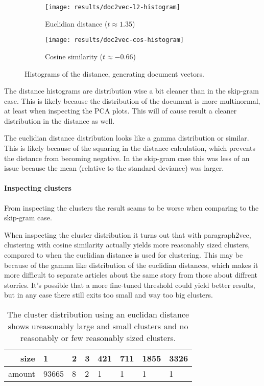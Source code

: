 \begin{figure}[H]
        \centering
        \begin{subfigure}[b]{0.49\textwidth}
                \texttt{[image: results/doc2vec-l2-histogram]}
                \caption{Euclidian distance ($t \approx 1.35$)}
        \end{subfigure}
        \begin{subfigure}[b]{0.49\textwidth}
                \texttt{[image: results/doc2vec-cos-histogram]}
                \caption{Cosine similarity ($t \approx -0.66$)}
        \end{subfigure}
        \caption{Histograms of the distance, generating document vectors.}
\end{figure}

The distance histograms are distribution wise a bit cleaner than in the skip-gram case. This is likely because the distribution of the document is more multinormal, at least when inspecting the PCA plots. This will of cause result a cleaner distribution in the distance as well.

The euclidian distance distribution looks like a gamma distribution or similar. This is likely because of the squaring in the distance calculation, which prevents the distance from becoming negative. In the skip-gram case this was less of an issue because the mean (relative to the standard deviance) was larger.

\paragraph{Inspecting clusters} From inspecting the clusters the result seams to be worse when comparing to the skip-gram case.

When inspecting the cluster distribution it turns out that with paragraph2vec, clustering with cosine similarity actually yields more reasonably sized clusters, compared to when the euclidian distance is used for clustering. This may be because of the gamma like distribution of the euclidian distances, which makes it more difficult to separate articles about the same story from those about diffrent storries. It's possible that a more fine-tuned threshold could yield better results, but in any case there still exits too small and way too big clusters.

\begin{table}[H]
\centering
\begin{tabular}{r|l l l l l l l }
size & 1 & 2 & 3 & 421 & 711 & 1855 & 3326 \\ \hline
amount & 93665 & 8 & 2 & 1 & 1 & 1 & 1
\end{tabular}
\caption{The cluster distribution using an euclidan distance shows ureasonably large and small clusters and no reasonably or few reasonably sized clusters.}
\end{table}

